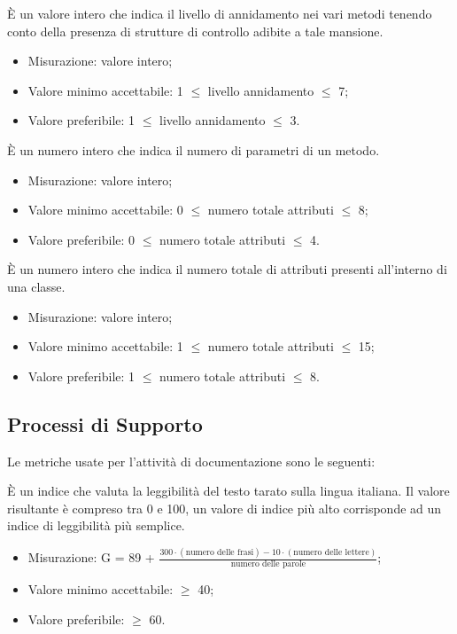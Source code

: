 		È un valore intero che indica il livello di annidamento nei vari metodi tenendo conto della presenza di strutture di controllo adibite a tale mansione.		
		\begin{itemize}
			\item{Misurazione: valore intero;}
			\item{Valore minimo accettabile: 1 $\leq$ livello annidamento $\leq$ 7;}
			\item{Valore preferibile: 1 $\leq$ livello annidamento $\leq$ 3.}
		\end{itemize}
			
		È un numero intero che indica il numero di parametri di un metodo. 
		\begin{itemize}
			\item{Misurazione: valore intero;}
			\item{Valore minimo accettabile: 0 $\leq$ numero totale attributi $\leq$ 8;}
			\item{Valore preferibile: 0 $\leq$ numero totale attributi $\leq$ 4.}
		\end{itemize}
			
		È un numero intero che indica il numero totale di attributi presenti all'interno di una classe.				\begin{itemize}
			\item{Misurazione: valore intero;}
			\item{Valore minimo accettabile: 1 $\leq$ numero totale attributi $\leq$ 15;}
			\item{Valore preferibile: 1 $\leq$ numero totale attributi $\leq$ 8.}
		\end{itemize}

\subsection{Processi di Supporto}

	Le metriche usate per l'attività di documentazione sono le seguenti:
	
		È un indice che valuta la leggibilità del testo tarato sulla lingua italiana. Il valore risultante è compreso tra 0 e 100, un valore di indice più alto corrisponde ad un indice di leggibilità più semplice.
		 \begin{itemize}
			\item{Misurazione: G = 89 + $\displaystyle\frac{300 \cdot{} (\mbox{numero delle frasi}) - 10 \cdot{} (\mbox{numero delle lettere})}{\mbox{numero delle parole}}$;}
			\item{Valore minimo accettabile: $\geq$ 40;}
			\item{Valore preferibile: $\geq$ 60.}
		\end{itemize}

